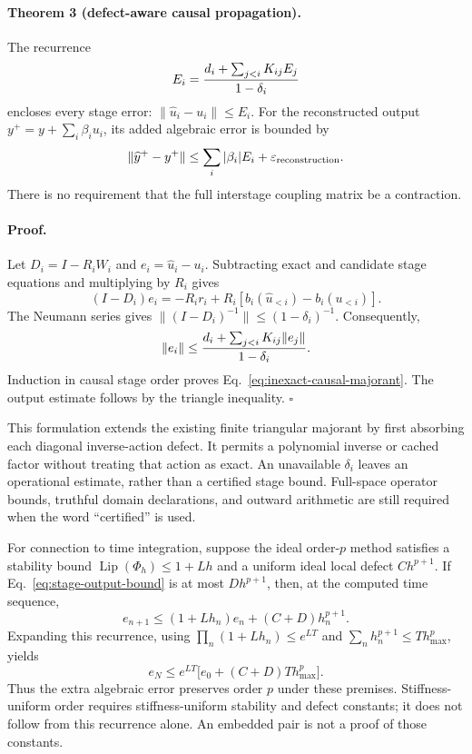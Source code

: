 \paragraph{Theorem 3 (defect-aware causal propagation).}
The recurrence
\begin{equation}
 E_i={d_i+\sum_{j<i}K_{ij}E_j\over1-\delta_i}
 \label{eq:inexact-causal-majorant}
\end{equation}
encloses every stage error:
$\|\widehat u_i-u_i\|\leq E_i$.  For the reconstructed output
$y^+=y+\sum_i\beta_i u_i$, its added algebraic error is bounded by
\begin{equation}
 \|\widehat y^+-y^+\|
 \leq\sum_i|\beta_i|E_i+\varepsilon_{\rm reconstruction}.
 \label{eq:stage-output-bound}
\end{equation}
There is no requirement that the full interstage coupling matrix be a
contraction.

\paragraph{Proof.}
Let $D_i=I-R_iW_i$ and $e_i=\widehat u_i-u_i$.  Subtracting exact and
candidate stage equations and multiplying by $R_i$ gives
\begin{equation}
 (I-D_i)e_i
 =-R_i r_i+R_i[b_i(\widehat u_{<i})-b_i(u_{<i})].
\end{equation}
The Neumann series gives $\|(I-D_i)^{-1}\|\leq(1-\delta_i)^{-1}$.
Consequently,
\begin{equation}
 \|e_i\|\leq
 {d_i+\sum_{j<i}K_{ij}\|e_j\|\over1-\delta_i}.
\end{equation}
Induction in causal stage order proves Eq.~\eqref{eq:inexact-causal-majorant}.
The output estimate follows by the triangle inequality.
\hfill$\square$

This formulation extends the existing finite triangular majorant by first
absorbing each diagonal inverse-action defect.  It permits a polynomial
inverse or cached factor without treating that action as exact.  An
unavailable $\delta_i$ leaves an operational estimate, rather than a
certified stage bound.  Full-space operator bounds, truthful domain
declarations, and outward arithmetic are still required when the word
``certified'' is used.

For connection to time integration, suppose the ideal order-$p$ method
satisfies a stability bound
$\operatorname{Lip}(\Phi_h)\leq1+Lh$ and a uniform ideal local defect
$Ch^{p+1}$.  If Eq.~\eqref{eq:stage-output-bound} is at most $Dh^{p+1}$,
then, at the computed time sequence,
\begin{equation}
 e_{n+1}\leq(1+Lh_n)e_n+(C+D)h_n^{p+1}.
\end{equation}
Expanding this recurrence, using
$\prod_n(1+Lh_n)\leq e^{LT}$ and
$\sum_n h_n^{p+1}\leq T h_{\max}^p$, yields
\begin{equation}
 e_N\leq e^{LT}\bigl[e_0+(C+D)T h_{\max}^p\bigr].
\end{equation}
Thus the extra algebraic error preserves order $p$ under these premises.
Stiffness-uniform order requires stiffness-uniform stability and defect
constants; it does not follow from this recurrence alone.  An embedded pair
is not a proof of those constants.

